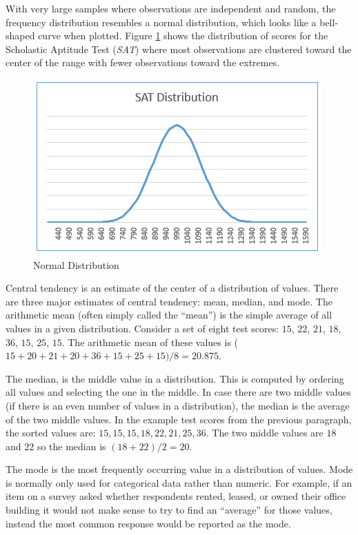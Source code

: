 With very large samples where observations are independent and random, the frequency distribution resembles a normal distribution, which looks like a bell-shaped curve when plotted. Figure \ref{14:fig02} shows the distribution of scores for the Scholastic Aptitude Test (\textit{SAT}) where most observations are clustered toward the center of the range with fewer observations toward the extremes. 

\begin{figure}[H]
	\centering
	\includegraphics[width=\maxwidth{.95\linewidth}]{gfx/14-NormDist}
	\caption{Normal Distribution}
	\label{14:fig02}
\end{figure}

Central tendency is an estimate of the center of a distribution of values. There are three major estimates of central tendency: mean, median, and mode. The arithmetic mean (often simply called the ``mean'') is the simple average of all values in a given distribution. Consider a set of eight test scores: $ 15 $, $ 22 $, $ 21 $, $ 18 $, $ 36 $, $ 15 $, $ 25 $, $ 15 $. The arithmetic mean of these values is ($ 15 + 20 + 21 + 20 + 36 + 15 + 25 + 15)/8 = 20.875 $.

The median, is the middle value in a distribution. This is computed by ordering all values and selecting the one in the middle. In case there are two middle values (if there is an even number of values in a distribution), the median is the average of the two middle values. In the example test scores from the previous paragraph, the sorted values are: $ 15 , 15 , 15 , 18 , 22 , 21, 25, 36 $. The two middle values are $ 18 $ and $ 22 $ so the median is $ (18 + 22)/2 = 20 $. 

The mode is the most frequently occurring value in a distribution of values. Mode is normally only used for categorical data rather than numeric. For example, if an item on a survey asked whether respondents rented, leased, or owned their office building it would not make sense to try to find an ``average'' for those values, instead the most common response would be reported as the mode. 

